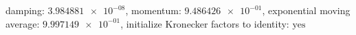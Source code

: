 damping: $\num[scientific-notation=true]{3.984881e-08}$, momentum: $\num[scientific-notation=true]{9.486426e-01}$, exponential moving average: $\num[scientific-notation=true]{9.997149e-01}$, initialize Kronecker factors to identity: $\text{yes}$